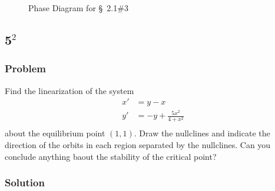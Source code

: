 \documentclass[12pt]{article}
\begin{document}
\begin{figure}
  \centering
  \caption{Phase Diagram for \S~2.1\#3}
  \label{fig:3-phase-diagram}
\end{figure}


\subsection{5$^2$}
\subsubsection*{Problem}
Find the linearization of the system
\begin{equation}
  \begin{aligned}
    x'&=y-x \\
    y'&=-y+\frac{5x^2}{4+x^2} \\
  \end{aligned}
\end{equation}
about the equilibrium point $(1,1)$. Draw the nullclines and indicate the
direction of the orbits in each region separated by the nullclines. Can you
conclude anything baout the stability of the critical point?
\subsubsection*{Solution}
\todo[]
\end{document}
